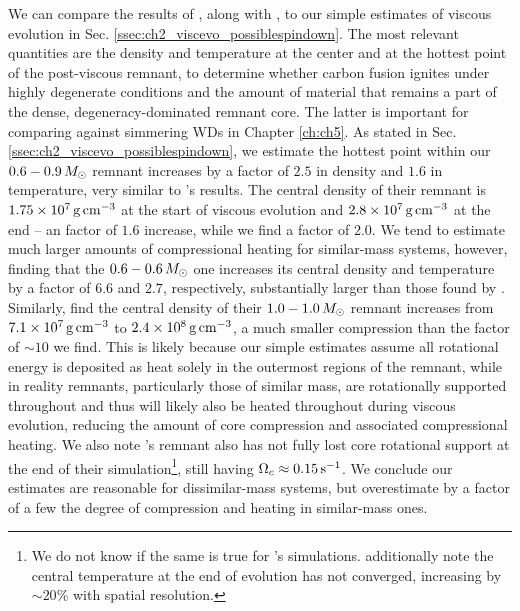 
We can compare the results of \cite{ji+13}, along with \cite{schw+12}, to our simple estimates of viscous evolution in Sec. \ref{ssec:ch2_viscevo_possiblespindown}.  The most relevant quantities are the density and temperature at the center and at the hottest point of the post-viscous remnant, to determine whether carbon fusion ignites under highly degenerate conditions and the amount of material that remains a part of the dense, degeneracy-dominated remnant core.  The latter is important for comparing against simmering WDs in Chapter \ref{ch:ch5}.  As stated in Sec. \ref{ssec:ch2_viscevo_possiblespindown}, we estimate the hottest point within our $0.6-0.9\,\Msun$ remnant increases by a factor of $2.5$ in density and $1.6$ in temperature, very similar to \cite{schw+12}'s results.  The central density of their remnant is $1.75\times10^7\,\gcc$ at the start of viscous evolution \citep{dan+11} and $2.8\times10^7\,\gcc$ at the end -- an factor of $1.6$ increase, while we find a factor of $2.0$.  We tend to estimate much larger amounts of compressional heating for similar-mass systems, however, finding that the $0.6 - 0.6\,\Msun$ one increases its central density and temperature by a factor of $6.6$ and $2.7$, respectively, substantially larger than those found by \cite{ji+13}.  Similarly, \cite{rask+14} find the central density of their $1.0-1.0\,\Msun$ remnant increases from $7.1\times10^7\,\gcc$ to $2.4\times10^8\,\gcc$, a much smaller compression than the factor of $\sim10$ we find.  This is likely because our simple estimates assume all rotational energy is deposited as heat solely in the outermost regions of the remnant, while in reality remnants, particularly those of similar mass, are rotationally supported throughout and thus will likely also be heated throughout during viscous evolution, reducing the amount of core compression and associated compressional heating.  We also note \cite{ji+13}'s remnant also has not fully lost core rotational support at the end of their simulation\footnote{We do not know if the same is true for \cite{rask+14}'s simulations.  \cite{ji+13} additionally note the central temperature at the end of evolution has not converged, increasing by $\sim20$\% with spatial resolution.}, still having $\Omegac \approx 0.15\,\psec$.  We conclude our estimates are reasonable for dissimilar-mass systems, but overestimate by a factor of a few the degree of compression and heating in similar-mass ones.

